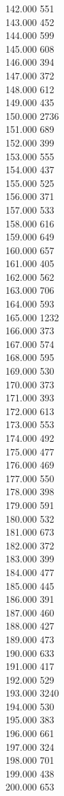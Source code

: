 { 142.000	551 \\
 143.000	452 \\
 144.000	599 \\
 145.000	608 \\
 146.000	394 \\
 147.000	372 \\
 148.000	612 \\
 149.000	435 \\
 150.000	2736 \\
 151.000	689 \\
 152.000	399 \\
 153.000	555 \\
 154.000	437 \\
 155.000	525 \\
 156.000	371 \\
 157.000	533 \\
 158.000	616 \\
 159.000	649 \\
 160.000	657 \\
 161.000	405 \\
 162.000	562 \\
 163.000	706 \\
 164.000	593 \\
 165.000	1232 \\
 166.000	373 \\
 167.000	574 \\
 168.000	595 \\
 169.000	530 \\
 170.000	373 \\
 171.000	393 \\
 172.000	613 \\
 173.000	553 \\
 174.000	492 \\
 175.000	477 \\
 176.000	469 \\
 177.000	550 \\
 178.000	398 \\
 179.000	591 \\
 180.000	532 \\
 181.000	673 \\
 182.000	372 \\
 183.000	399 \\
 184.000	477 \\
 185.000	445 \\
 186.000	391 \\
 187.000	460 \\
 188.000	427 \\
 189.000	473 \\
 190.000	633 \\
 191.000	417 \\
 192.000	529 \\
 193.000	3240 \\
 194.000	530 \\
 195.000	383 \\
 196.000	661 \\
 197.000	324 \\
 198.000	701 \\
 199.000	438 \\
 200.000	653 \\
}
